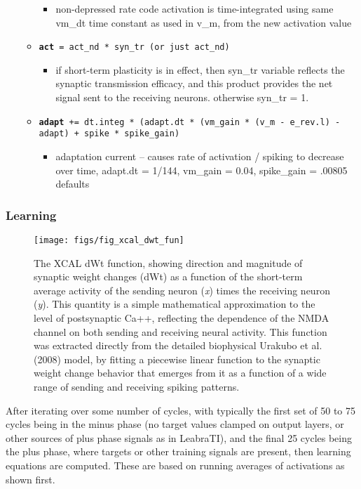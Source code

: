 \begin{itemize}
\begin{itemize}
\begin{itemize}
    \item non-depressed rate code activation is time-integrated using same vm\_dt time constant as used in v\_m, from the new activation value
    \end{itemize}
  \item {\tt {\bf act} = act\_nd * syn\_tr  (or just act\_nd)}
    \begin{itemize}
    \item if short-term plasticity is in effect, then syn\_tr variable reflects the synaptic transmission efficacy, and this product provides the net signal sent to the receiving neurons.  otherwise syn\_tr = 1.
    \end{itemize}
  \item {\tt {\bf adapt} += dt.integ * (adapt.dt * (vm\_gain * (v\_m - e\_rev.l) - adapt) + spike * spike\_gain)}
    \begin{itemize}
    \item adaptation current -- causes rate of activation / spiking to decrease over time, adapt.dt = 1/144, vm\_gain = 0.04, spike\_gain = .00805 defaults
    \end{itemize}
  \end{itemize}
\end{itemize}

\subsubsection{Learning}

\begin{SCfigure}[20][t]
  \texttt{[image: figs/fig\_xcal\_dwt\_fun]}
  \caption{\footnotesize The XCAL dWt function, showing direction and magnitude of synaptic weight changes (dWt) as a function of the short-term average activity of the sending neuron ({\em x}) times the receiving neuron ({\em y}).  This quantity is a simple mathematical approximation to the level of postsynaptic Ca++, reflecting the dependence of the NMDA channel on both sending and receiving neural activity.  This function was extracted directly from the detailed biophysical Urakubo et al. (2008) model, by fitting a piecewise linear function to the synaptic weight change behavior that emerges from it as a function of a wide range of sending and receiving spiking patterns.}
  \label{fig.xcal_dwt_fun}
\end{SCfigure}

After iterating over some number of cycles, with typically the first set of 50 to 75 cycles being in the minus phase (no target values clamped on output layers, or other sources of plus phase signals as in LeabraTI), and the final 25 cycles being the plus phase, where targets or other training signals are present, then learning equations are computed.  These are based on running averages of activations as shown first.

